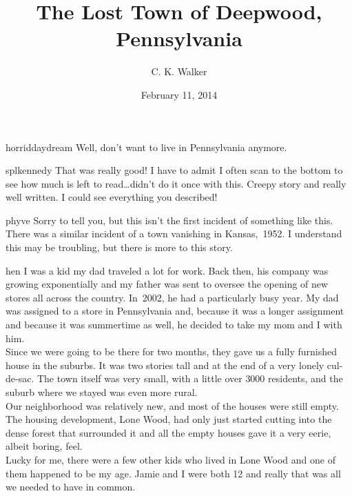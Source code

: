 \documentclass[a5paper]{scrartcl}
\title{The Lost Town of Deepwood, Pennsylvania}
\author{C. K. Walker}
\date{February 11, 2014}
\begin{document}
\maketitle

\begin{shadequote}[l]{horriddaydream}
Well, don't want to live in Pennsylvania anymore.
\end{shadequote}

\begin{shadequote}[l]{splkennedy}
That was really good! I have to admit I often scan to the bottom to see how much is left to read\dots didn't do it once with this. Creepy story and really well written. I could see everything you described!
\end{shadequote}

\begin{shadequote}[l]{phyve}
Sorry to tell you, but this isn't the first incident of something like this. There was a similar incident of a town vanishing in Kansas,~1952. I understand this may be troubling, but there is more to this story.
\end{shadequote}

hen I was a kid my dad traveled a lot for work. Back then, his company was growing exponentially and my father was sent to oversee the opening of new stores all across the country. In~2002, he had a particularly busy year. My dad was assigned to a store in Pennsylvania and, because it was a longer assignment and because it was summertime as well, he decided to take my mom and I with him. \\


Since we were going to be there for two months, they gave us a fully furnished house in the suburbs. It was two stories tall and at the end of a very lonely cul-de-sac. The town itself was very small, with a little over $\num{3000}$ residents, and the suburb where we stayed was even more rural.  \\


Our neighborhood was relatively new, and most of the houses were still empty. The housing development, Lone Wood, had only just started cutting into the dense forest that surrounded it and all the empty houses gave it a very eerie, albeit boring, feel. \\


Lucky for me, there were a few other kids who lived in Lone Wood and one of them happened to be my age. Jamie and I were both 12 and really that was all we needed to have in common. \\
\end{document}
